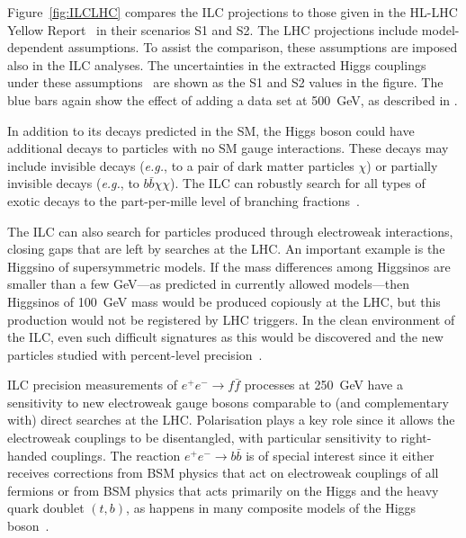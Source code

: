 \documentclass[%
 reprint,
 amsmath,amssymb,
 aps,
]{revtex4-1}
\def\eg{{\it e.g.}}
\def\ee{e^+e^-}
\begin{document}
Figure~\ref{fig:ILCLHC} compares the ILC projections to those given in the
HL-LHC Yellow Report~\cite{Yellow} in their scenarios S1
and S2. The LHC projections include
model-dependent assumptions.  To assist the comparison,
these assumptions are imposed also in the ILC analyses. The 
uncertainties in the extracted Higgs couplings under these 
assumptions~\cite{ILCforESS} are shown as the  S1 and S2 values in the figure. The blue bars again show the effect of adding a data set at 
500~GeV, as described in \cite{ILCforESS}.


In addition to its decays predicted in the SM, the Higgs boson could have additional decays 
to particles with no SM gauge interactions.    These decays may
include invisible decays (\eg, to a pair of dark matter particles $\chi$)  or
partially invisible decays (\eg, to $b\bar b \chi \chi$).   The ILC
can robustly search for all types of exotic decays  to the 
part-per-mille level of branching fractions~\cite{Liu:2016zki}.

The ILC can also search for particles produced through electroweak
interactions, closing gaps that are left by searches at the LHC.  An
important example is the Higgsino of supersymmetric models.   If the
mass  differences among Higgsinos are smaller than a few GeV---as predicted in currently allowed models---then Higgsinos
of 100~GeV mass would be produced copiously at the LHC, but this
production would not be registered by LHC triggers.  In the clean
environment 
of the ILC, even such difficult signatures as this 
would be discovered and the new particles 
studied with percent-level precision~\cite{Higgsino}.

ILC precision measurements of $\ee\to f\bar f$ processes at 250~GeV have a sensitivity to new
electroweak gauge bosons comparable to (and complementary with) 
direct searches at the LHC.  Polarisation plays a
key role since it allows  the electroweak couplings to be
disentangled, with particular 
sensitivity to right-handed couplings. The reaction $\ee\to b\bar b$ 
is of special interest since it either receives corrections from BSM physics that act on electroweak couplings of all fermions or from BSM physics 
that acts primarily on the Higgs and the heavy quark doublet $(t,b)$, as happens in many composite 
models of the Higgs boson~\cite{eetobb1,eetobb2}. 
\end{document}
